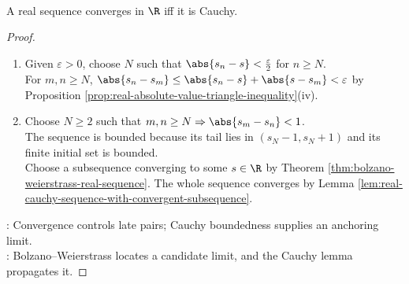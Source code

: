 \begin{theorem} \label{thm:real-cauchy-convergence-criterion} \\
A real sequence converges in $\R$ iff it is Cauchy.
\begin{proof}
\begin{enumerate}[label=\roman*.]
\setlength{\itemsep}{0pt}
\item[$(\Rightarrow)$] Given $\varepsilon>0$, choose $N$ such that $\abs{s_n-s}<\frac{\varepsilon}{2}$ for $n\geq N$.\\
For $m,n\geq N$, $\abs{s_n-s_m}\leq\abs{s_n-s}+\abs{s-s_m}<\varepsilon$ by Proposition \ref{prop:real-absolute-value-triangle-inequality}(iv).
\item[$(\Leftarrow)$] Choose $N\geq2$ such that $m,n\geq N\Rightarrow\abs{s_m-s_n}<1$.\\
The sequence is bounded because its tail lies in $(s_N-1,s_N+1)$ and its finite initial set is bounded.\\
Choose a subsequence converging to some $s\in\R$ by Theorem \ref{thm:bolzano-weierstrass-real-sequence}. The whole sequence converges by Lemma \ref{lem:real-cauchy-sequence-with-convergent-subsequence}.
\end{enumerate}
: Convergence controls late pairs; Cauchy boundedness supplies an anchoring limit.\\
: Bolzano--Weierstrass locates a candidate limit, and the Cauchy lemma propagates it.
\end{proof}
\end{theorem}
